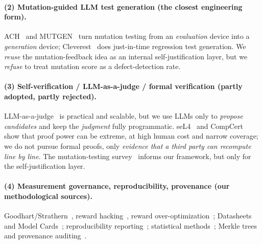 \documentclass{article}
\begin{document}
\paragraph{(2) Mutation-guided LLM test generation (the closest engineering form).}
ACH~\cite{foster2025ach} and MUTGEN~\cite{wang2025mutgen} turn mutation testing from an
\emph{evaluation} device into a \emph{generation} device; Cleverest~\cite{liu2025cleverest} does
just-in-time regression test generation. We \emph{reuse} the mutation-feedback idea as an internal
self-justification layer, but we \emph{refuse} to treat mutation score as a defect-detection rate.

\paragraph{(3) Self-verification / LLM-as-a-judge / formal verification (partly adopted, partly rejected).}
LLM-as-a-judge~\cite{zheng2023judging} is practical and scalable, but we use LLMs only to
\emph{propose candidates} and keep the \emph{judgment} fully programmatic. seL4~\cite{klein2009sel4}
and CompCert~\cite{leroy2009compcert} show that proof power can be extreme, at high human cost and
narrow coverage; we do not pursue formal proofs, only \emph{evidence that a third party can
recompute line by line}. The mutation-testing survey~\cite{jia2011mutation} informs our framework,
but only for the self-justification layer.

\paragraph{(4) Measurement governance, reproducibility, provenance (our methodological sources).}
Goodhart/Strathern~\cite{goodhart1975problems,strathern1997improving}, reward
hacking~\cite{skalse2022rewardhacking}, reward over-optimization~\cite{gao2023scaling};
Datasheets~\cite{gebru2021datasheets} and Model Cards~\cite{mitchell2019modelcards};
reproducibility reporting~\cite{pineau2021improving}; statistical methods~\cite{clopper1934use,
fisher1935design,mcnemar1947note,benjamini1995controlling,holm1979simple,cohen1960coefficient};
Merkle trees~\cite{merkle1988digital} and provenance auditing~\cite{kao2025constantsize,wang2026whoaudits}.
\end{document}

